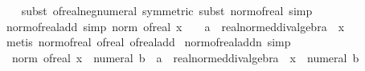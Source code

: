 \begin{isabellebody}
%
\isadelimproof
\ \ %
\endisadelimproof
%
\isatagproof
{}\isamarkupfalse%
\ {\isacharparenleft}{\kern0pt}subst\ of{\isacharunderscore}{\kern0pt}real{\isacharunderscore}{\kern0pt}neg{\isacharunderscore}{\kern0pt}numeral\ {\isacharbrackleft}{\kern0pt}symmetric{\isacharbrackright}{\kern0pt}{\isacharcomma}{\kern0pt}\ subst\ norm{\isacharunderscore}{\kern0pt}of{\isacharunderscore}{\kern0pt}real{\isacharcomma}{\kern0pt}\ simp{\isacharparenright}{\kern0pt}%
\endisatagproof
{\isafoldproof}%
%
\isadelimproof
\isanewline
%
\endisadelimproof
\isanewline
{}\isamarkupfalse%
\ norm{\isacharunderscore}{\kern0pt}of{\isacharunderscore}{\kern0pt}real{\isacharunderscore}{\kern0pt}add{}\ {\isacharbrackleft}{\kern0pt}simp{\isacharbrackright}{\kern0pt}{\isacharcolon}{\kern0pt}\ {\isachardoublequoteopen}norm\ {\isacharparenleft}{\kern0pt}of{\isacharunderscore}{\kern0pt}real\ x\ {\isacharplus}{\kern0pt}\ {}\ {\isacharcolon}{\kern0pt}{\isacharcolon}{\kern0pt}\ {\isacharprime}{\kern0pt}a\ {\isacharcolon}{\kern0pt}{\isacharcolon}{\kern0pt}\ real{\isacharunderscore}{\kern0pt}normed{\isacharunderscore}{\kern0pt}div{\isacharunderscore}{\kern0pt}algebra{\isacharparenright}{\kern0pt}\ {\isacharequal}{\kern0pt}\ {\isasymbar}x\ {\isacharplus}{\kern0pt}\ {}{\isasymbar}{\isachardoublequoteclose}\isanewline
%
\isadelimproof
\ \ %
\endisadelimproof
%
\isatagproof
{}\isamarkupfalse%
\ {\isacharparenleft}{\kern0pt}metis\ norm{\isacharunderscore}{\kern0pt}of{\isacharunderscore}{\kern0pt}real\ of{\isacharunderscore}{\kern0pt}real{\isacharunderscore}{\kern0pt}{}\ of{\isacharunderscore}{\kern0pt}real{\isacharunderscore}{\kern0pt}add{\isacharparenright}{\kern0pt}%
\endisatagproof
{\isafoldproof}%
%
\isadelimproof
\isanewline
%
\endisadelimproof
\isanewline
{}\isamarkupfalse%
\ norm{\isacharunderscore}{\kern0pt}of{\isacharunderscore}{\kern0pt}real{\isacharunderscore}{\kern0pt}addn\ {\isacharbrackleft}{\kern0pt}simp{\isacharbrackright}{\kern0pt}{\isacharcolon}{\kern0pt}\isanewline
\ \ {\isachardoublequoteopen}norm\ {\isacharparenleft}{\kern0pt}of{\isacharunderscore}{\kern0pt}real\ x\ {\isacharplus}{\kern0pt}\ numeral\ b\ {\isacharcolon}{\kern0pt}{\isacharcolon}{\kern0pt}\ {\isacharprime}{\kern0pt}a\ {\isacharcolon}{\kern0pt}{\isacharcolon}{\kern0pt}\ real{\isacharunderscore}{\kern0pt}normed{\isacharunderscore}{\kern0pt}div{\isacharunderscore}{\kern0pt}algebra{\isacharparenright}{\kern0pt}\ {\isacharequal}{\kern0pt}\ {\isasymbar}x\ {\isacharplus}{\kern0pt}\ numeral\ b{\isasymbar}{\isachardoublequoteclose}\isanewline

\end{isabellebody}
